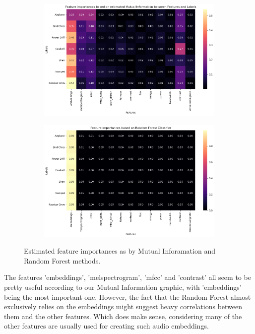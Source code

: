 \begin{figure}[htbp]
  \centering
  \begin{subfigure}[b]{0.49\textwidth}
    \includegraphics[width=\textwidth]{figs/1_MI.png}
  \end{subfigure}
  \hfill
  \begin{subfigure}[b]{0.49\textwidth}
    \includegraphics[width=\textwidth]{figs/1_RF.png}
  \end{subfigure}
  \caption{Estimated feature importances as by Mutual Inforamation and Random Forest methods.}
  \label{fig:1_FI}
\end{figure}

The features 'embeddings', 'melspectrogram', 'mfcc' and 'contrast' all seem to be pretty useful according to our Mutual Information graphic, with 'embeddings' being the most important one. However, the fact that the Random Forest almost exclusively relies on the embeddings might suggest heavy correlations between them and the other features. Which does make sense, considering many of the other features are usually used for creating such audio embeddings.


